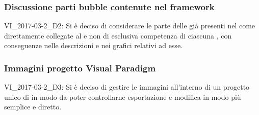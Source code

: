\subsubsection{Discussione parti bubble contenute nel framework}
VI_2017-03-2_D2: Si è deciso di considerare le parte delle  già presenti nel  come direttamente collegate al  e non di esclusiva competenza di ciascuna , con conseguenze nelle descrizioni e nei grafici relativi ad esse.

\subsubsection{Immagini progetto Visual Paradigm}
VI_2017-03-2_D3: Si è deciso di gestire le immagini all'interno di un progetto unico di  in modo da poter controllarne esportazione e modifica in modo più semplice e diretto.

\clearpage
